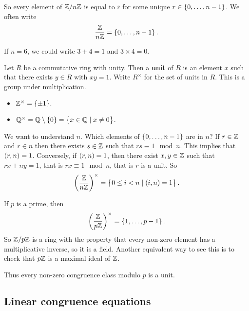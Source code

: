 So every element of $ \mathbb{Z} / n\mathbb{Z} $ is equal to $ \overline{r} $ for some unique $ r \in \cbr{0, \dots, n - 1} $. We often write
$$ \dfrac{\Z}{n\Z} = \cbr{0, \dots, n - 1}. $$

\begin{example*}
If $ n = 6 $, we could write $ 3 + 4 = 1 $ and $ 3 \times 4 = 0 $.
\end{example*}

Let $ R $ be a commutative ring with unity. Then a \textbf{unit} of $ R $ is an element $ x $ such that there exists $ y \in R $ with $ xy = 1 $. Write $ R^\times $ for the set of units in $ R $. This is a group under multiplication.

\begin{example*}
\hfill
\begin{itemize}
\item $ \Z^\times = \cbr{\pm 1} $.
\item $ \Q^\times = \Q \setminus \cbr{0} = \cbr{x \in \Q \mid x \ne 0} $.
\end{itemize}
\end{example*}

We want to understand $ \unit{n} $. Which elements of $ \cbr{0, \dots, n - 1} $ are in $ \unit{n} $? If $ r \in \mathbb{Z} $ and $ r \in \unit{n} $ then there exists $ s \in \mathbb{Z} $ such that $ rs \equiv 1 \mod n $. This implies that $ \br{r, n} = 1 $. Conversely, if $ \br{r, n} = 1 $, then there exist $ x, y \in \mathbb{Z} $ such that $ rx + ny = 1 $, that is $ rx \equiv 1 \mod n $, that is $ r $ is a unit. So
$$ \Unit{n} = \cbr{0 \le i < n \mid \br{i, n} = 1}. $$

\begin{example*}
If $ p $ is a prime, then
$$ \Unit{p} = \cbr{1, \dots, p - 1}. $$
So $ \mathbb{Z} / p\mathbb{Z} $ is a ring with the property that every non-zero element has a multiplicative inverse, so it is a field. Another equivalent way to see this is to check that $ p\mathbb{Z} $ is a maximal ideal of $ \mathbb{Z} $.
\end{example*}

Thus every non-zero congruence class modulo $ p $ is a unit.

\pagebreak

\subsection{Linear congruence equations}


